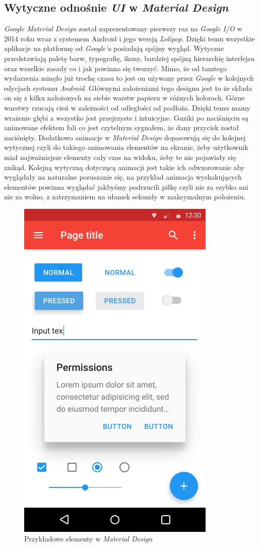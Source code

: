 \documentclass[openright]{xmgr}
\begin{document}
\subsection{Wytyczne odnośnie \textit{UI} w \textit{Material Design}}
\textit{Google Material Design} został zaprezentowany pierwszy raz na \textit{Google I/O }w 2014 roku wraz z systemem Android i jego wersją \textit{Lolipop}.  Dzięki temu wszystkie aplikacje na platformę od \textit{Google’a} posiadają spójny wygląd. Wytyczne przedstawiają paletę barw, typografię, ikony, bardziej spójną hierarchię interfejsu oraz wszelkie zasady co i jak powinno się tworzyć. Mimo, że od tamtego wydarzenia minęło już trochę czasu to jest on używany przez \textit{Google} w kolejnych edycjach systemu \textit{Android}. Głównymi założeniami tego designu jest to że składa on się z kilku  nałożonych na siebie warstw papieru w różnych kolorach. Górne warstwy rzucają cień w zależności od odległości od podłoża. Dzięki temu mamy wrażenie głębi a wszystko jest przejrzyste i intuicyjne. Guziki  po naciśnięciu są animowane efektem fali co jest czytelnym sygnałem, że dany przycisk został naciśnięty. Dodatkowo animacje w \textit{Material Design} dopasowują się do kolejnej wytycznej czyli do takiego animowania elementów na ekranie, żeby użytkownik miał najważniejsze elementy cały czas na widoku, żeby te nie pojawiały się znikąd. Kolejną wytyczną dotyczącą animacji jest takie ich odwzorowanie aby wyglądały na naturalne poruszanie się, na przykład animacja wyskakujących elementów powinna wyglądać jakbyśmy podrzucili piłkę czyli nie za szybko ani nie za wolno, z zatrzymaniem na ułamek sekundy w maksymalnym położeniu.  
\begin{figure}[H]
\centering
\includegraphics[width=0.5\hsize]{images/Material_Design_example.png}
\caption{Przykładowe elementy w \textit{Material Design}\label{RYS.1}}
\end{figure}
\end{document}

